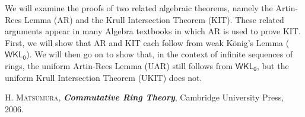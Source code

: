 \documentclass[bsl,meeting,11pt]{asl}
\newcommand{\NP}{}
\begin{document}
\thispagestyle{empty}


\NP  
{}


We will examine the proofs of two related algebraic theorems, namely the Artin-Rees Lemma (\textsf{AR}) and the Krull Intersection Theorem (\textsf{KIT}). These related arguments appear in many Algebra textbooks in which \textsf{AR} is used to prove \textsf{KIT}. First, we will show that \textsf{AR} and \textsf{KIT} each follow from weak K\"onig's Lemma ($\mathsf{WKL_0}$). We will then go on to show that, in the context of infinite sequences of rings, the uniform Artin-Rees Lemma (\textsf{UAR}) still follows from $\mathsf{WKL_0}$, but the uniform Krull Intersection Theorem (\textsf{UKIT}) does not. 

\begin{thebibliography}{10}

  {\scshape H. Matsumura},
  {\bfseries\itshape Commutative Ring Theory},
  Cambridge University Press,
  2006.

\end{thebibliography}

\vspace*{-0.5\baselineskip}
\end{document}
